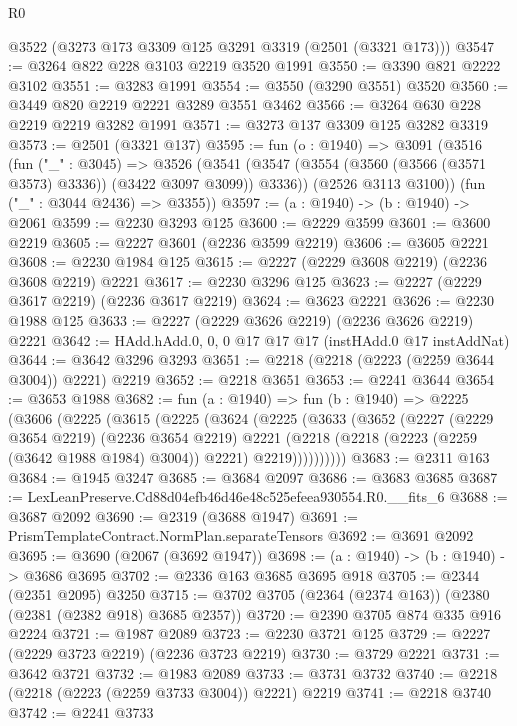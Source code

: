 \begin{lexlean}{R0}
\begin{coremodule}
    @3522
    (@3273 @173 @3309 @125 @3291 @3319 (@2501 (@3321 @173)))
@3547 := @3264 @822 @228 @3103 @2219 @3520 @1991
@3550 := @3390 @821 @2222 @3102
@3551 := @3283 @1991
@3554 := @3550 (@3290 @3551) @3520
@3560 := @3449 @820 @2219 @2221 @3289 @3551 @3462
@3566 := @3264 @630 @228 @2219 @2219 @3282 @1991
@3571 := @3273 @137 @3309 @125 @3282 @3319
@3573 := @2501 (@3321 @137)
@3595 := fun (o : @1940) =>
  @3091
    (@3516
      (fun ("_" : @3045) =>
      @3526
        (@3541 (@3547 (@3554 (@3560 (@3566 (@3571 @3573) @3336)) (@3422 @3097 @3099)) @3336))
        (@2526 @3113 @3100))
      (fun ("_" : @3044 @2436) => @3355))
@3597 := (a : @1940) -> (b : @1940) -> @2061
@3599 := @2230 @3293 @125
@3600 := @2229 @3599
@3601 := @3600 @2219
@3605 := @2227 @3601 (@2236 @3599 @2219)
@3606 := @3605 @2221
@3608 := @2230 @1984 @125
@3615 := @2227 (@2229 @3608 @2219) (@2236 @3608 @2219) @2221
@3617 := @2230 @3296 @125
@3623 := @2227 (@2229 @3617 @2219) (@2236 @3617 @2219)
@3624 := @3623 @2221
@3626 := @2230 @1988 @125
@3633 := @2227 (@2229 @3626 @2219) (@2236 @3626 @2219) @2221
@3642 := HAdd.hAdd.{0, 0, 0} @17 @17 @17 (instHAdd.{0} @17 instAddNat)
@3644 := @3642 @3296 @3293
@3651 := @2218 (@2218 (@2223 (@2259 @3644 @3004)) @2221) @2219
@3652 := @2218 @3651
@3653 := @2241 @3644
@3654 := @3653 @1988
@3682 := fun (a : @1940) =>
  fun (b : @1940) =>
  @2225
    (@3606
      (@2225
        (@3615
          (@2225
            (@3624
              (@2225
                (@3633
                  (@3652
                    (@2227
                      (@2229 @3654 @2219)
                      (@2236 @3654 @2219)
                      @2221
                      (@2218 (@2218 (@2223 (@2259 (@3642 @1988 @1984) @3004)) @2221) @2219))))))))))
@3683 := @2311 @163
@3684 := @1945 @3247
@3685 := @3684 @2097
@3686 := @3683 @3685
@3687 := LexLeanPreserve.Cd88d04efb46d46e48c525efeea930554.R0.__fits_6
@3688 := @3687 @2092
@3690 := @2319 (@3688 @1947)
@3691 := PrismTemplateContract.NormPlan.separateTensors
@3692 := @3691 @2092
@3695 := @3690 (@2067 (@3692 @1947))
@3698 := (a : @1940) -> (b : @1940) -> @3686 @3695
@3702 := @2336 @163 @3685 @3695 @918
@3705 := @2344 (@2351 @2095) @3250
@3715 := @3702 @3705 (@2364 (@2374 @163)) (@2380 (@2381 (@2382 @918) @3685 @2357))
@3720 := @2390 @3705 @874 @335 @916 @2224
@3721 := @1987 @2089
@3723 := @2230 @3721 @125
@3729 := @2227 (@2229 @3723 @2219) (@2236 @3723 @2219)
@3730 := @3729 @2221
@3731 := @3642 @3721
@3732 := @1983 @2089
@3733 := @3731 @3732
@3740 := @2218 (@2218 (@2223 (@2259 @3733 @3004)) @2221) @2219
@3741 := @2218 @3740
@3742 := @2241 @3733

\end{coremodule}
\end{lexlean}

